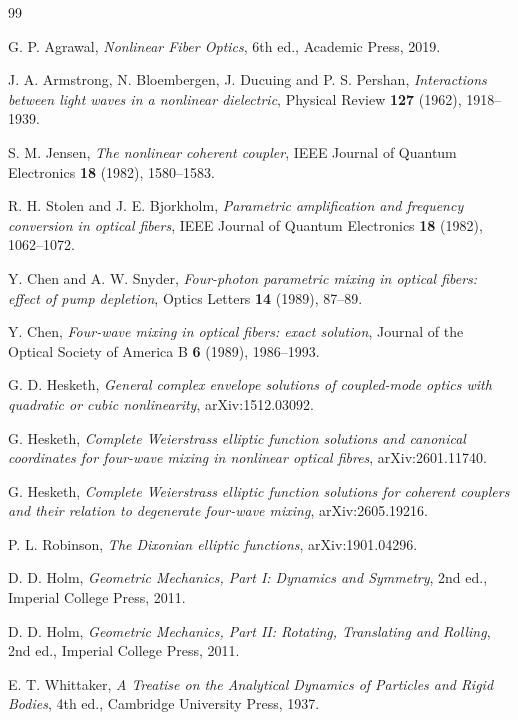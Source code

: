 \documentclass[11pt]{article}
\begin{document}
\begin{thebibliography}{99}
\addtolength{\itemsep}{-1pt}

G. P. Agrawal, \emph{Nonlinear Fiber Optics}, 6th ed., Academic Press, 2019.

J. A. Armstrong, N. Bloembergen, J. Ducuing and P. S. Pershan, \emph{Interactions between light waves in a nonlinear dielectric}, Physical Review \textbf{127} (1962), 1918--1939.

S. M. Jensen, \emph{The nonlinear coherent coupler}, IEEE Journal of Quantum Electronics \textbf{18} (1982), 1580--1583.

R. H. Stolen and J. E. Bjorkholm, \emph{Parametric amplification and frequency conversion in optical fibers}, IEEE Journal of Quantum Electronics \textbf{18} (1982), 1062--1072.

Y. Chen and A. W. Snyder, \emph{Four-photon parametric mixing in optical fibers: effect of pump depletion}, Optics Letters \textbf{14} (1989), 87--89.

Y. Chen, \emph{Four-wave mixing in optical fibers: exact solution}, Journal of the Optical Society of America B \textbf{6} (1989), 1986--1993.

G. D. Hesketh, \emph{General complex envelope solutions of coupled-mode optics with quadratic or cubic nonlinearity}, arXiv:1512.03092.

G. Hesketh, \emph{Complete Weierstrass elliptic function solutions and canonical coordinates for four-wave mixing in nonlinear optical fibres}, arXiv:2601.11740.

G. Hesketh, \emph{Complete Weierstrass elliptic function solutions for coherent couplers and their relation to degenerate four-wave mixing}, arXiv:2605.19216.

P. L. Robinson, \emph{The Dixonian elliptic functions}, arXiv:1901.04296.

D. D. Holm, \emph{Geometric Mechanics, Part I: Dynamics and Symmetry}, 2nd ed., Imperial College Press, 2011.

D. D. Holm, \emph{Geometric Mechanics, Part II: Rotating, Translating and Rolling}, 2nd ed., Imperial College Press, 2011.

E. T. Whittaker, \emph{A Treatise on the Analytical Dynamics of Particles and Rigid Bodies}, 4th ed., Cambridge University Press, 1937.


\end{thebibliography}
\end{document}
